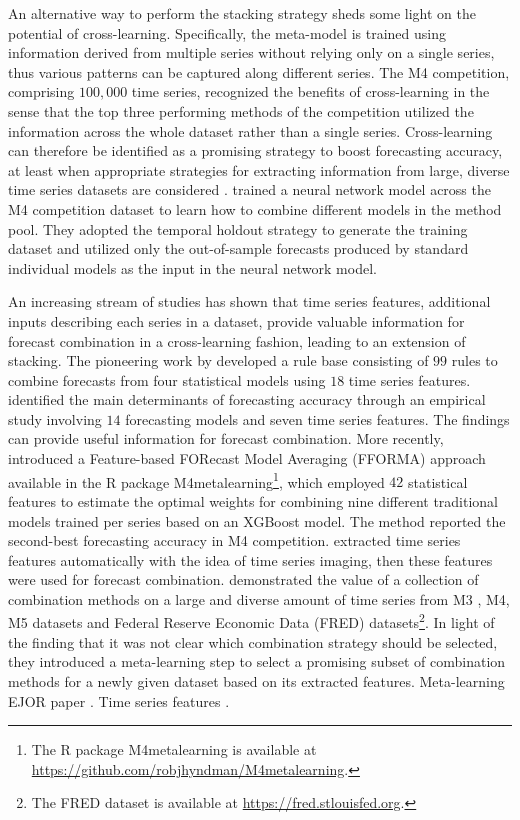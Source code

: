 \documentclass[11pt]{article}
\newcommand{\pkg}[1]{{\normalfont\fontseries{b}\selectfont #1}}
\let\proglang=\textsf
\begin{document}
An alternative way to perform the stacking strategy sheds some light on the potential of cross-learning. Specifically, the meta-model is trained using information derived from multiple series without relying only on a single series, thus various patterns can be captured along different series. The M4 competition, comprising $100,000$ time series, recognized the benefits of cross-learning in the sense that the top three performing methods of the competition utilized the information across the whole dataset rather than a single series. Cross-learning can therefore be identified as a promising strategy to boost forecasting accuracy, at least when appropriate strategies for extracting information from large, diverse time series datasets are considered \citep{Kang2020-sa,Semenoglou2020-xx}. \cite{Zhao2020-ep} trained a neural network model across the M4 competition dataset to learn how to combine different models in the method pool. They adopted the temporal holdout strategy to generate the training dataset and utilized only the out-of-sample forecasts produced by standard individual models as the input in the neural network model.

An increasing stream of studies has shown that time series features, additional inputs describing each series in a dataset, provide valuable information for forecast combination in a cross-learning fashion, leading to an extension of stacking. The pioneering work by \cite{Collopy1992-ey} developed a rule base consisting of $99$ rules to combine forecasts from four statistical models using $18$ time series features. \cite{Petropoulos2014-uy} identified the main determinants of forecasting accuracy through an empirical study involving $14$ forecasting models and seven time series features. The findings can provide useful information for forecast combination. More recently, \cite{Montero-Manso2020-tq} introduced a Feature-based FORecast Model Averaging (FFORMA) approach available in the \proglang{R} package \pkg{M4metalearning}\footnote{The \proglang{R} package \pkg{M4metalearning} is available at \url{https://github.com/robjhyndman/M4metalearning}.}, which employed $42$ statistical features \citep[implemented using the \proglang{R} package \pkg{tsfeatures},][]{rtsfeatures} to estimate the optimal weights for combining nine different traditional models trained per series based on an XGBoost model. The method reported the second-best forecasting accuracy in M4 competition. \cite{Li2020-od} extracted time series features automatically with the idea of time series imaging, then these features were used for forecast combination. \cite{Gastinger2021-ey} demonstrated the value of a collection of combination methods on a large and diverse amount of time series from M3 \citep{Makridakis2000-he}, M4, M5 \citep{Makridakis2020-fn} datasets and Federal Reserve Economic Data (FRED) datasets\footnote{The FRED dataset is available at \url{https://fred.stlouisfed.org}.}. In light of the finding that it was not clear which combination strategy should be selected, they introduced a meta-learning step to select a promising subset of combination methods for a newly given dataset based on its extracted features. {\color{red} Meta-learning EJOR paper \cite{Ma2021-np}. Time series features \cite{Henderson2021-gl}.}
\end{document}
